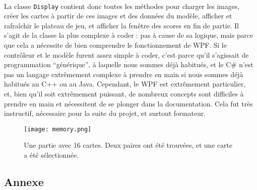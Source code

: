 \paragraph{}La classe \lstinline|Display| contient donc toutes les méthodes pour charger les images, créer les cartes à partir de ces images et des données du modèle, afficher et rafraîchir le plateau de jeu, et afficher la fenêtre des scores en fin de partie. Il s'agit de la classe la plus complexe à coder : pas à cause de sa logique, mais parce que cela a nécessite de bien comprendre le fonctionnement de WPF. Si le contrôleur et le modèle furent assez simple à coder, c'est parce qu'il s'agissait de programmation \enquote{générique}, à laquelle nous sommes déjà habitués, et le C\# n'est pas un langage extrêmement complexe à prendre en main si nous sommes déjà habitués au C++ ou au Java. Cependant, le WPF est extrêmement particulier, et, bien qu'il soit extrêmement puissant, de nombreux concepts sont difficiles à prendre en main et nécessitent de se plonger dans la documentation. Cela fut très instructif, nécessaire pour la suite du projet, et surtout formateur. 


\begin{figure}[H]
	\centering
	\texttt{[image: memory.png]}
	\caption{Une partie avec 16 cartes. Deux paires ont été trouvées, et une carte a été sélectionnée.}
	\label{fig:memory}
\end{figure}

\newpage
\subsection{Annexe}
\label{sec:memory_annexe}


\newpage

\newpage

\newpage

